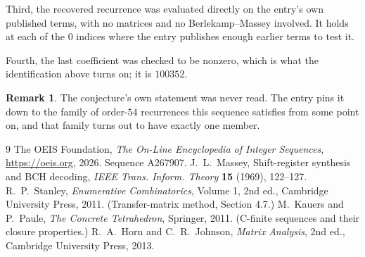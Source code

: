 \documentclass[11pt,a4paper]{article}
\theoremstyle{plain}
\theoremstyle{definition}
\newtheorem{remark}[theorem]{Remark}
\begin{document}
Third, the recovered recurrence was evaluated directly on the entry's own published terms, with
no matrices and no Berlekamp--Massey involved. It holds at each of the $0$ indices where
the entry publishes enough earlier terms to test it.

Fourth, the last coefficient was checked to be nonzero, which is what the identification above
turns on; it is $100352$.

\begin{remark}
The conjecture's own statement was never read. The entry pins it down to the family of
order-$54$ recurrences this sequence satisfies from some point on, and that family turns
out to have exactly one member.
\end{remark}

\begin{thebibliography}{9}
 The OEIS Foundation, \emph{The On-Line Encyclopedia of Integer
Sequences}, \url{https://oeis.org}, 2026. Sequence A267907.
 J.~L.~Massey, Shift-register synthesis and BCH decoding, \emph{IEEE
Trans. Inform. Theory} \textbf{15} (1969), 122--127.
 R.~P.~Stanley, \emph{Enumerative Combinatorics}, Volume 1, 2nd ed.,
Cambridge University Press, 2011. (Transfer-matrix method, Section 4.7.)
 M.~Kauers and P.~Paule, \emph{The Concrete Tetrahedron}, Springer, 2011.
(C-finite sequences and their closure properties.)
 R.~A.~Horn and C.~R.~Johnson, \emph{Matrix Analysis}, 2nd ed., Cambridge
University Press, 2013.
\end{thebibliography}
\end{document}
